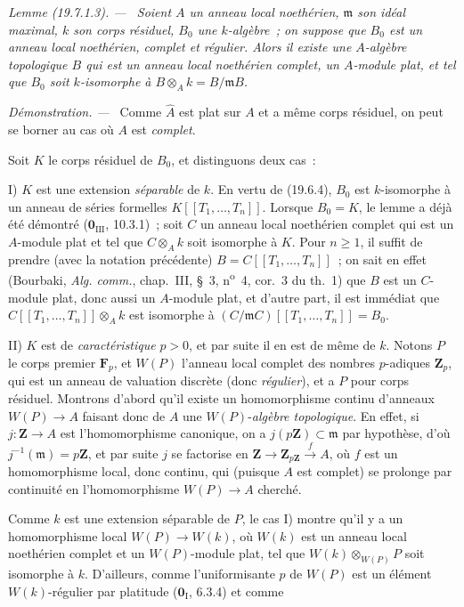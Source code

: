 \documentclass[10pt,oneside]{book}
\makeatletter
\newcommand{\setmanualcurrentlabel}[1]{\def\@currentlabel{#1}}
\newenvironment{lemma}[1][]{%
  \setmanualcurrentlabel{#1}\par\medskip\noindent\itshape Lemme (#1). ---\ }{\par}
\newenvironment{proof}{%
  \par\medskip\noindent\textit{Démonstration. ---\ }}{\par}
\makeatother
\begin{document}
\begin{lemma}[19.7.1.3]
\label{0.19.7.1.3-fr}
Soient $A$ un anneau local noethérien, $\mathfrak m$ son idéal maximal, $k$ son
corps résiduel, $B_0$ une $k$-algèbre~; on suppose que $B_0$ est un anneau
local noethérien, complet et régulier. Alors il existe une $A$-algèbre
topologique $B$ qui est un anneau local noethérien complet, un $A$-module plat,
et tel que $B_0$ soit $k$-isomorphe à
$B\otimes_A k=B/\mathfrak mB$.
\end{lemma}

\begin{proof}
Comme $\widehat A$ est plat sur $A$ et a même corps résiduel, on peut se borner
au cas où $A$ est \emph{complet}.

Soit $K$ le corps résiduel de $B_0$, et distinguons deux cas~:

\medskip
\noindent I) $K$ est une extension \emph{séparable} de $k$. En vertu de
(19.6.4), $B_0$ est $k$-isomorphe à un anneau de séries formelles
$K[[T_1,\ldots,T_n]]$. Lorsque $B_0=K$, le lemme a déjà été démontré
($\mathbf 0_{\mathrm{III}}$, 10.3.1)~; soit $C$ un anneau local noethérien
complet qui est un $A$-module plat et tel que $C\otimes_A k$ soit isomorphe à
$K$. Pour $n\geq1$, il suffit de prendre (avec la notation précédente)
$B=C[[T_1,\ldots,T_n]]$~; on sait en effet (Bourbaki,
\emph{Alg. comm.}, chap.~III, §~3, n\textsuperscript{o}~4, cor.~3 du th.~1)
que $B$ est un $C$-module plat, donc aussi un $A$-module plat, et d'autre part,
il est immédiat que $C[[T_1,\ldots,T_n]]\otimes_A k$ est isomorphe à
$(C/\mathfrak mC)[[T_1,\ldots,T_n]]=B_0$.

\medskip
\noindent II) $K$ est de \emph{caractéristique} $p>0$, et par suite il en est
de même de $k$. Notons $P$ le corps premier $\mathbf F_p$, et $W(P)$ l'anneau
local complet des nombres $p$-adiques $\mathbf Z_p$, qui est un anneau de
valuation discrète (donc \emph{régulier}), et a $P$ pour corps résiduel.
Montrons d'abord qu'il existe un homomorphisme continu d'anneaux $W(P)\to A$
faisant donc de $A$ une $W(P)$-\emph{algèbre topologique}. En effet, si
$j:\mathbf Z\to A$ est l'homomorphisme canonique, on a
$j(p\mathbf Z)\subset\mathfrak m$ par hypothèse, d'où
$j^{-1}(\mathfrak m)=p\mathbf Z$, et par suite $j$ se factorise en
$\mathbf Z\to\mathbf Z_{p\mathbf Z}\xrightarrow{f}A$, où $f$ est un
homomorphisme local, donc continu, qui (puisque $A$ est complet) se prolonge
par continuité en l'homomorphisme $W(P)\to A$ cherché.

Comme $k$ est une extension séparable de $P$, le cas I) montre qu'il y a un
homomorphisme local $W(P)\to W(k)$, où $W(k)$ est un anneau local noethérien
complet et un $W(P)$-module plat, tel que $W(k)\otimes_{W(P)}P$ soit isomorphe
à $k$. D'ailleurs, comme l'uniformisante $p$ de $W(P)$ est un élément
$W(k)$-régulier par platitude ($\mathbf 0_{\mathrm I}$, 6.3.4) et comme


\end{proof}
\end{document}
